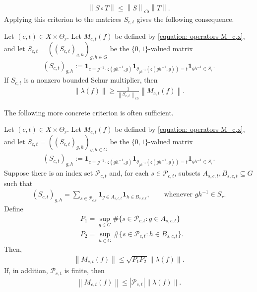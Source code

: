 \documentclass[12pt,reqno]{amsart}
\newcommand{\norm}[1]{\left\|#1\right\|}
\numberwithin{equation}{section}
\begin{document}
\begin{align*}
    \norm{S\circ T}\le \norm{S}_{\operatorname{cb}}\norm{T}.
\end{align*}
Applying this criterion to the matrices $S_{c,t}$ gives the following consequence.
\begin{corollary}
    Let $(c,t)\in X\times \Theta_r$.
    Let $M_{c,t}(f)$ be defined by \eqref{equation: operators M_c,x}, and let $S_{c,t}=((S_{c,t})_{g,h})_{g,h\in G}$ be the $\{0,1\}$-valued matrix
    \begin{align*}
        (S_{c,t})_{g,h}:=\mathbf{1}_{c=g^{-1}\cdot\mathfrak{c}(gh^{-1},g)}\mathbf{1}_{\theta_{gh^{-1}}(\mathfrak{c}(gh^{-1},g))=t}\mathbf{1}_{gh^{-1}\in S_r}.
    \end{align*}
    If $S_{c,t}$ is a nonzero bounded Schur multiplier, then
    \begin{align*}
        \norm{\lambda(f)} \ge  \frac{1}{\norm{S_{c,t}}_{\operatorname{cb}}}\norm{M_{c,t}(f)}.
    \end{align*}
\end{corollary}
The following more concrete criterion is often sufficient.
\begin{corollary}\label{corollary: lower bound simple version}
    Let $(c,t)\in X\times \Theta_r$.
    Let $M_{c,t}(f)$ be defined by \eqref{equation: operators M_c,x}, and let $S_{c,t}=((S_{c,t})_{g,h})_{g,h\in G}$ be the $\{0,1\}$-valued matrix
    \begin{align*}
        (S_{c,t})_{g,h}:=\mathbf{1}_{c=g^{-1}\cdot\mathfrak{c}(gh^{-1},g)}\mathbf{1}_{\theta_{gh^{-1}}(\mathfrak{c}(gh^{-1},g))=t}\mathbf{1}_{gh^{-1}\in S_r}.
    \end{align*}
    Suppose there is an index set $\mathcal{P}_{c,t}$ and, for each $s\in\mathcal{P}_{c,t}$, subsets $A_{s,c,t},B_{s,c,t}\subseteq G$ such that 
    \begin{align*}
        (S_{c,t})_{g,h}=\sum_{s\in \mathcal{P}_{c,t}} \mathbf{1}_{g\in A_{s,c,t}}\mathbf{1}_{h\in B_{s,c,t}},\qquad \text{whenever }gh^{-1}\in S_r.
    \end{align*}
    Define
    \begin{align*}
        &P_1=\sup_{g\in G}\#\{s\in \mathcal{P}_{c,t}: g\in A_{s,c,t}\}\\
        &P_2=\sup_{h\in G}\#\{s\in \mathcal{P}_{c,t}: h\in B_{s,c,t}\}.
    \end{align*}
    Then,
    \begin{align*}
        \norm{M_{c,t}(f)}\le \sqrt{P_1P_2}\norm{\lambda(f)}.
    \end{align*}
    If, in addition, $\mathcal{P}_{c,t}$ is finite, then
    \begin{align*}
        \norm{M_{c,t}(f)}\le |\mathcal{P}_{c,t}|\norm{\lambda(f)}.
    \end{align*}
\end{corollary}
\end{document}
